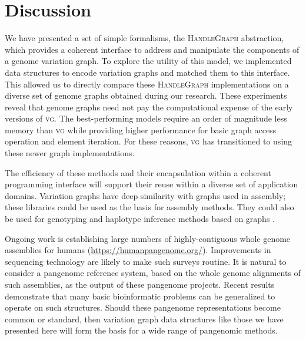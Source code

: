 \documentclass{bioinfo}
\begin{document}
\section{Discussion}

We have presented a set of simple formalisms, the \textsc{HandleGraph} abstraction, which provides a coherent interface to address and manipulate the components of a genome variation graph.
To explore the utility of this model, we implemented data structures to encode variation graphs and matched them to this interface.
This allowed us to directly compare these \textsc{HandleGraph} implementations on a diverse set of genome graphs obtained during our research.
These experiments reveal that genome graphs need not pay the computational expense of the early versions of \textsc{vg}.
The best-performing models require an order of magnitude less memory than \textsc{vg} while providing higher performance for basic graph access operation and element iteration.
For these reasons, \textsc{vg} has transitioned to using these newer graph implementations. 

The efficiency of these methods and their encapsulation within a coherent programming interface will support their reuse within a diverse set of application domains.
Variation graphs have deep similarity with graphs used in assembly; these libraries could be used as the basis for assembly methods.
They could also be used for genotyping and haplotype inference methods based on graphs \citep{garg2018graph}.

Ongoing work is establishing large numbers of highly-contiguous whole genome assemblies for humans (\url{https://humanpangenome.org/}).
Improvements in sequencing technology are likely to make such surveys routine.
It is natural to consider a pangenome reference system, based on the whole genome alignments of such assemblies, as the output of these pangenome projects.
Recent results demonstrate that many basic bioinformatic problems can be generalized to operate on such structures.
Should these pangenome representations become common or standard, then variation graph data structures like those we have presented here will form the basis for a wide range of pangenomic methods.



%
%
\end{document}
